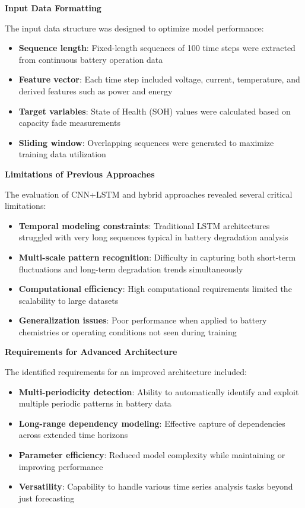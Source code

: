 \textbf{Input Data Formatting}

The input data structure was designed to optimize model performance:

\begin{itemize}
    \item \textbf{Sequence length}: Fixed-length sequences of 100 time steps were extracted from continuous battery operation data
    \item \textbf{Feature vector}: Each time step included voltage, current, temperature, and derived features such as power and energy
    \item \textbf{Target variables}: State of Health (SOH) values were calculated based on capacity fade measurements
    \item \textbf{Sliding window}: Overlapping sequences were generated to maximize training data utilization
\end{itemize}

\textbf{Limitations of Previous Approaches}

The evaluation of CNN+LSTM and hybrid approaches revealed several critical limitations:

\begin{itemize}
    \item \textbf{Temporal modeling constraints}: Traditional LSTM architectures struggled with very long sequences typical in battery degradation analysis
    \item \textbf{Multi-scale pattern recognition}: Difficulty in capturing both short-term fluctuations and long-term degradation trends simultaneously
    \item \textbf{Computational efficiency}: High computational requirements limited the scalability to large datasets
    \item \textbf{Generalization issues}: Poor performance when applied to battery chemistries or operating conditions not seen during training
\end{itemize}

\textbf{Requirements for Advanced Architecture}

The identified requirements for an improved architecture included:

\begin{itemize}
    \item \textbf{Multi-periodicity detection}: Ability to automatically identify and exploit multiple periodic patterns in battery data
    \item \textbf{Long-range dependency modeling}: Effective capture of dependencies across extended time horizons
    \item \textbf{Parameter efficiency}: Reduced model complexity while maintaining or improving performance
    \item \textbf{Versatility}: Capability to handle various time series analysis tasks beyond just forecasting
\end{itemize}


